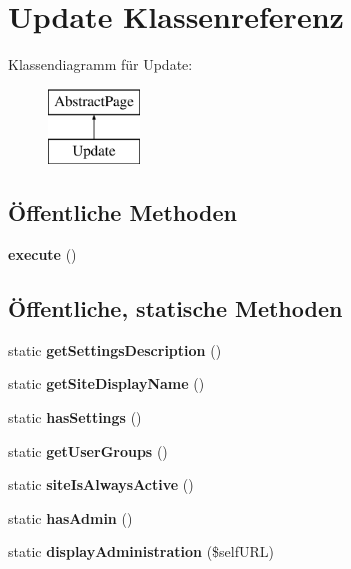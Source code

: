 \hypertarget{class_update}{}\section{Update Klassenreferenz}
\label{class_update}
Klassendiagramm für Update\+:\begin{figure}[H]
\begin{center}
\leavevmode
\includegraphics[height=2.000000cm]{class_update}
\end{center}
\end{figure}
\subsection*{Öffentliche Methoden}
\begin{DoxyCompactItemize}
\item 
\mbox{\label{class_update_afc73b79d068436c0ac2db1b99969a4a2}} 
{\bfseries execute} ()
\end{DoxyCompactItemize}
\subsection*{Öffentliche, statische Methoden}
\begin{DoxyCompactItemize}
\item 
\mbox{\label{class_update_acd8586cc870deb5683bcb731dcfb94c3}} 
static {\bfseries get\+Settings\+Description} ()
\item 
\mbox{\label{class_update_ad1d9bad1e12a3acad2419f5270de26cb}} 
static {\bfseries get\+Site\+Display\+Name} ()
\item 
\mbox{\label{class_update_a1ae52abcee483fbf06fbfd14a0933c86}} 
static {\bfseries has\+Settings} ()
\item 
\mbox{\label{class_update_a681d368580dddacf59e3f42c49b074a2}} 
static {\bfseries get\+User\+Groups} ()
\item 
\mbox{\label{class_update_a2ea0b7f27078242bc45b26610ba188f2}} 
static {\bfseries site\+Is\+Always\+Active} ()
\item 
\mbox{\label{class_update_a259dba7fbb7a6a2f6279265b5e29512f}} 
static {\bfseries has\+Admin} ()
\item 
\mbox{\label{class_update_a87ea68514c24f2117d0c5781a856295b}} 
static {\bfseries display\+Administration} (\$self\+U\+RL)
\end{DoxyCompactItemize}
